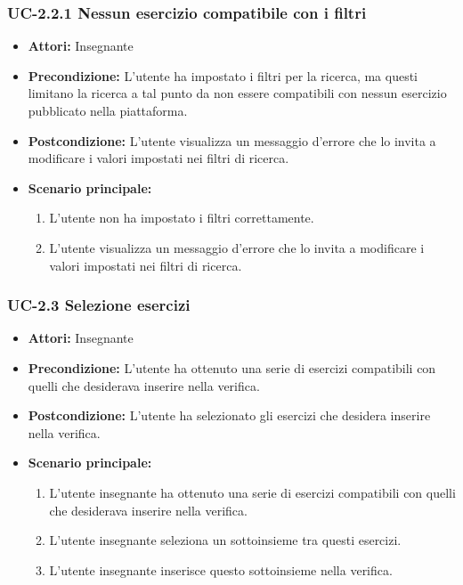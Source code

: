 \subsubsection{UC-2.2.1 Nessun esercizio compatibile con i filtri}
\begin{itemize}
		\item \textbf{Attori: } Insegnante
		
		\item \textbf{Precondizione: }L'utente ha impostato i filtri per la ricerca, ma questi limitano la ricerca a tal punto da non essere compatibili con nessun esercizio pubblicato nella piattaforma.
		\item \textbf{Postcondizione: }L'utente visualizza un messaggio d'errore che lo invita a modificare i valori impostati nei filtri di ricerca.
		\item \textbf{Scenario principale: }
		\begin{enumerate}
		\item L'utente non ha impostato i filtri correttamente.
		 \item L'utente visualizza un messaggio d'errore che lo invita a modificare i valori impostati nei filtri di ricerca.
		\end{enumerate}
\end{itemize}
\subsubsection{UC-2.3 Selezione esercizi}
\begin{itemize}
		\item \textbf{Attori: } Insegnante
		
		\item \textbf{Precondizione: }L'utente ha ottenuto una serie di esercizi compatibili con quelli che desiderava inserire nella verifica.
		\item \textbf{Postcondizione: }L'utente ha selezionato gli esercizi che desidera inserire nella verifica.
		\item \textbf{Scenario principale: }
		\begin{enumerate}
		\item L'utente insegnante ha ottenuto una serie di esercizi compatibili con quelli che desiderava inserire nella verifica. 
		\item L'utente insegnante seleziona un sottoinsieme tra questi esercizi.
		\item L'utente insegnante inserisce questo sottoinsieme nella verifica.
		\end{enumerate}
\end{itemize}

